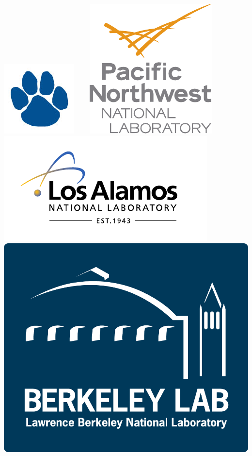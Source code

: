 \begin{center}
\includegraphics[scale=0.35]{./logos/paw.jpg} \ \ \ \
\includegraphics[scale=0.45]{./logos/PNNL_Color_Logo_Vertical} \ \ \ \
\includegraphics[scale=0.5]{./logos/lanl} \ \ \ \
\includegraphics[scale=0.25]{./logos/LBNL_Full_Logo_Final} \ \ \ \

\end{center}

